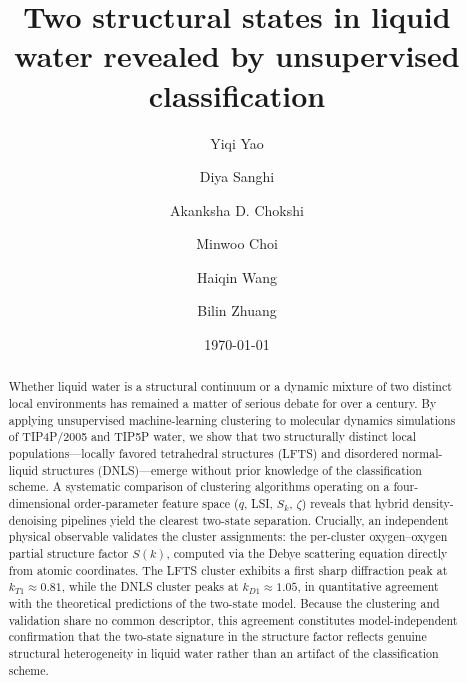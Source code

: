 \documentclass[aps, amsmath,amssymb, reprint, twocolumn, superscriptaddress]{revtex4-2}
\begin{document}
\title{Two structural states in liquid water revealed by unsupervised classification}
\author{Yiqi Yao}
\author{Diya Sanghi}
\author{Akanksha D. Chokshi}
\author{Minwoo Choi}
\author{Haiqin Wang}
\author{Bilin Zhuang}
\date{\today}

\begin{abstract}
Whether liquid water is a structural continuum or a dynamic mixture of two distinct local environments
has remained a matter of serious debate for over a century. By applying unsupervised machine-learning
clustering to molecular dynamics simulations of TIP4P/2005 and TIP5P water, we show that two
structurally distinct local populations---locally favored tetrahedral structures (LFTS) and disordered
normal-liquid structures (DNLS)---emerge without prior knowledge of the classification scheme.
A systematic comparison of clustering algorithms operating on a four-dimensional order-parameter feature
space ($q$, LSI, $S_k$, $\zeta$) reveals that hybrid density-denoising pipelines yield the clearest
two-state separation. Crucially, an independent physical observable validates the cluster assignments: the per-cluster oxygen--oxygen partial structure factor $S(k)$, computed via the Debye
scattering equation directly from atomic coordinates. The LFTS cluster exhibits a first sharp diffraction
peak at $k_{T1}\approx 0.81$, while the DNLS cluster peaks at $k_{D1} \approx 1.05$, in quantitative
agreement with the theoretical predictions of the two-state model. Because the clustering and validation
share no common descriptor, this agreement constitutes model-independent confirmation that the two-state
signature in the structure factor reflects genuine structural heterogeneity in liquid water rather than an
artifact of the classification scheme.
\end{abstract}

\maketitle
\end{document}
